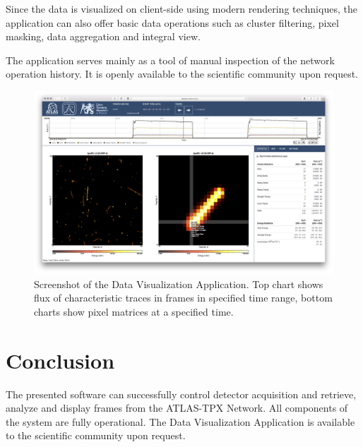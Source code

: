 \documentclass[journal]{IEEEtran}
\begin{document}
Since the data is visualized on client-side using modern rendering techniques, the application can also offer basic data operations such as cluster filtering, pixel masking, data aggregation and integral view.

The application serves mainly as a tool of manual inspection of the network operation history. It is openly available to the scientific community upon request.

\begin{figure}[tbp]
	\centering
        \includegraphics[clip, width=.45\textwidth, angle = 0 ]{Plots/screen-tpx01-crosshair-zoomed.png}
	  \caption {Screenshot of the Data Visualization Application. \cite{Manek2016} Top chart shows flux of characteristic traces in frames in specified time range, bottom charts show pixel matrices at a specified time.}
    \label{fig:positions}
\end{figure}

\section{\label{sec:conclusion}Conclusion}
The presented software can successfully control detector acquisition and retrieve, analyze and display frames from the ATLAS-TPX Network. All components of the system are fully operational. The Data Visualization Application is  available to the scientific community upon request.


%

%
\end{document}
